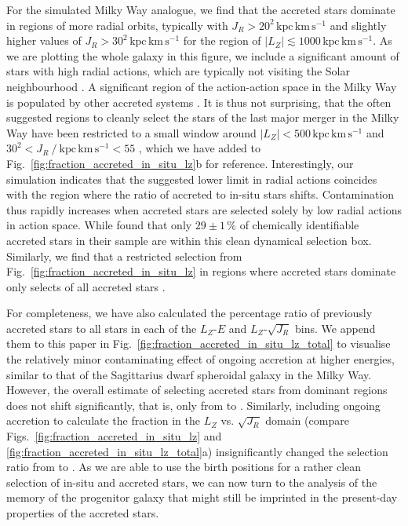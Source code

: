 \documentclass[fleqn,usenatbib]{mnras}
\begin{document}
For the simulated Milky Way analogue, we find that the accreted stars dominate in regions of more radial orbits, typically with $J_R > 20^2\,\mathrm{kpc\,km\,s^{-1}}$ and slightly higher values of $J_R > 30^2\,\mathrm{kpc\,km\,s^{-1}}$ for the region of $\vert L_Z \vert \lesssim 1000\,\mathrm{kpc\,km\,s^{-1}}$. As we are plotting the whole galaxy in this figure, we include a significant amount of stars with high radial actions, which are typically not visiting the Solar neighbourhood \citep[compare Figs.~\ref{fig:lz_e_jr}e and \ref{fig:lz_e_jr}f and see for example][]{Feuillet2019}. A significant region of the action-action space in the Milky Way is populated by other accreted systems \citep[for example][]{Myeong2019, Naidu2020}. It is thus not surprising, that the often suggested regions to cleanly select the stars of the last major merger in the Milky Way have been restricted to a small window around $\vert L_Z \vert < 500\,\mathrm{kpc\,km\,s^{-1}}$ and $30^2 < J_R~/~\mathrm{kpc\,km\,s^{-1}} < 55$ \citep{Feuillet2021, Buder2022}, which we have added to Fig.~\ref{fig:fraction_accreted_in_situ_lz}b for reference. Interestingly, our simulation indicates that the suggested lower limit in radial actions coincides with the region where the ratio of accreted to in-situ stars shifts. Contamination thus rapidly increases when accreted stars are selected solely by low radial actions in action space. While \citet{Buder2022} found that only $29 \pm 1\,\mathrm{\%}$ of chemically identifiable accreted stars in their sample are within this clean dynamical selection box. Similarly, we find that a restricted selection from Fig.~\ref{fig:fraction_accreted_in_situ_lz} in regions where accreted stars dominate only selects  of all accreted stars \citep[for a study of other selection criteria and their purity as well as completeness see][]{Carrillo2024}.

For completeness, we have also calculated the percentage ratio of previously accreted stars to all stars in each of the $L_Z$-$E$ and $L_Z$-$\sqrt{J_R}$ bins. We append them to this paper in Fig.~\ref{fig:fraction_accreted_in_situ_lz_total} to visualise the relatively minor contaminating effect of ongoing accretion at higher energies, similar to that of the Sagittarius dwarf spheroidal galaxy in the Milky Way. However, the overall estimate of selecting accreted stars from dominant regions does not shift significantly, that is, only from  to . Similarly, including ongoing accretion to calculate the fraction in the $L_Z$ vs. $\sqrt{J_R}$ domain (compare Figs.~\ref{fig:fraction_accreted_in_situ_lz} and \ref{fig:fraction_accreted_in_situ_lz_total}a) insignificantly changed the selection ratio from  to . As we are able to use the birth positions for a rather clean selection of in-situ and accreted stars, we can now turn to the analysis of the memory of the progenitor galaxy that might still be imprinted in the present-day properties of the accreted stars.
\end{document}
